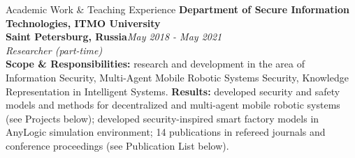 \documentclass[10pt]{resume} %
\begin{document}
\begin{rSection}{Academic Work \& Teaching Experience}
\textbf{Department of Secure Information Technologies, ITMO University}\\
\textbf{Saint Petersburg, Russia}\hfill\small{\em May 2018 - May 2021}\normalsize
\\{\em Researcher (part-time)}
\\\textbf{Scope \& Responsibilities:} research and development in the area of Information Security, Multi-Agent Mobile Robotic Systems Security, Knowledge Representation in Intelligent Systems. \textbf{Results:} developed security and safety models and methods for decentralized and multi-agent mobile robotic systems (see Projects below); developed security-inspired smart factory models in AnyLogic simulation environment; 14 publications in refereed journals and conference proceedings (see Publication List below). 
\end{rSection}



\end{document}
